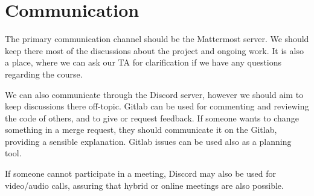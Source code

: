 \section{Communication}

The primary communication channel should be the Mattermost server. We should keep there most of the discussions about the project and ongoing work. It is also a place, where we can ask our TA for clarification if we have any questions regarding the course.

We can also communicate through the Discord server, however we should aim to keep discussions there off-topic. Gitlab can be used for commenting and reviewing the code of others, and to give or request feedback. If someone wants to change something in a merge request, they should communicate it on the Gitlab, providing a sensible explanation. Gitlab issues can be used also as a planning tool.

If someone cannot participate in a meeting, Discord may also be used for video/audio calls, assuring that hybrid or online meetings are also possible.
